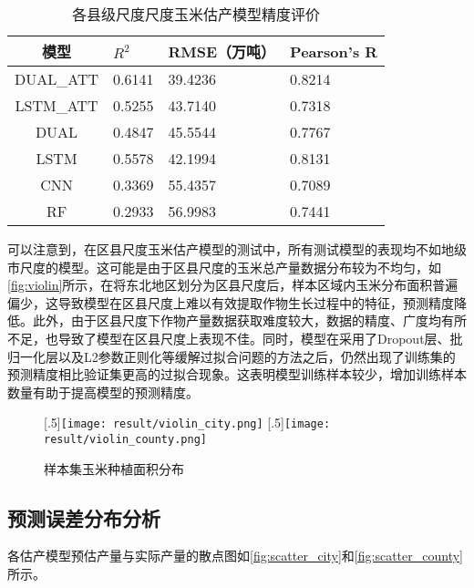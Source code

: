 \begin{table}
  \centering
  \caption{各县级尺度尺度玉米估产模型精度评价}
  \label{tab:score_county}
  \begin{tabularx}{\linewidth}{cX<{\centering}X<{\centering}X<{\centering}}
      \toprule
      模型 & $R^2$ & RMSE（万吨） & Pearson's R \\
      \midrule
      DUAL\_ATT & 0.6141 & 39.4236 & 0.8214 \\
      LSTM\_ATT & 0.5255 & 43.7140 & 0.7318 \\
      DUAL & 0.4847 & 45.5544 & 0.7767 \\
      LSTM & 0.5578 & 42.1994 & 0.8131 \\
      CNN & 0.3369 & 55.4357 & 0.7089 \\
      RF & 0.2933 & 56.9983 & 0.7441 \\ 
      \bottomrule
  \end{tabularx}
\end{table}

\par 可以注意到，在区县尺度玉米估产模型的测试中，所有测试模型的表现均不如地级市尺度的模型。这可能是由于区县尺度的玉米总产量数据分布较为不均匀，如\autoref{fig:violin}所示，在将东北地区划分为区县尺度后，样本区域内玉米分布面积普遍偏少，这导致模型在区县尺度上难以有效提取作物生长过程中的特征，预测精度降低。此外，由于区县尺度下作物产量数据获取难度较大，数据的精度、广度均有所不足，也导致了模型在区县尺度上表现不佳。同时，模型在采用了Dropout层、批归一化层以及L2参数正则化等缓解过拟合问题的方法之后，仍然出现了训练集的预测精度相比验证集更高的过拟合现象。这表明模型训练样本较少，增加训练样本数量有助于提高模型的预测精度。

\begin{figure}
  \centering
  [.5\linewidth]{\texttt{[image: result/violin\_city.png]}}\hfill
  [.5\linewidth]{\texttt{[image: result/violin\_county.png]}}\hfill
  \caption{样本集玉米种植面积分布}
  \label{fig:violin}
\end{figure}

\subsection{预测误差分布分析}

\par 各估产模型预估产量与实际产量的散点图如\autoref{fig:scatter_city}和\autoref{fig:scatter_county}所示。


